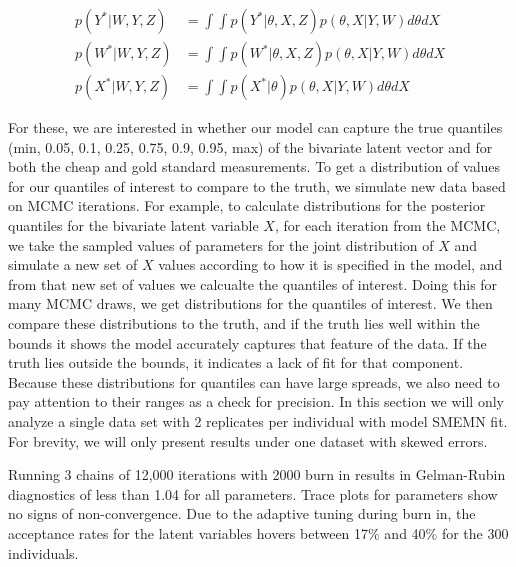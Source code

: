 \documentclass[11pt]{article}\usepackage[]{graphicx}\usepackage[]{color}
\begin{document}
\begin{align}
  \label{ypostpred}
  p(Y^*|W,Y,Z) &= \int \int p(Y^*|\theta,X,Z) p(\theta, X|Y,W) d\theta dX \\
  \label{wpostpred}
  p(W^*|W,Y,Z) &= \int \int p(W^*|\theta,X,Z) p(\theta, X|Y,W) d\theta dX \\
  \label{xpostpred}
  p(X^*|W,Y,Z) &= \int \int p(X^*|\theta) p(\theta, X|Y,W) d\theta dX
\end{align}


For these, we are interested in whether our model can capture the true quantiles (min, 0.05, 0.1, 0.25, 0.75, 0.9, 0.95, max) of the bivariate latent vector and for both the cheap and gold standard measurements. To get a distribution of values for our quantiles of interest to compare to the truth, we simulate new data based on MCMC iterations. For example, to calculate distributions for the posterior quantiles for the bivariate latent variable $X$, for each iteration from the MCMC, we  take the sampled values of parameters for the joint distribution of $X$ and simulate a new set of $X$ values according to how it is specified in the model, and from that new set of values we calcualte the quantiles of interest. Doing this for many MCMC draws, we get distributions for the quantiles of interest. We then compare these distributions to the truth, and if the truth lies well within the bounds it shows the model accurately captures that feature of the data. If the truth lies outside the bounds, it indicates a lack of fit for that component. Because these distributions for quantiles can have large spreads, we also need to pay attention to their ranges as a check for precision. In this section we will only analyze a single data set with 2 replicates per individual with model SMEMN fit. For brevity, we will only present results under one dataset with skewed errors. 

Running 3 chains of 12,000 iterations with 2000 burn in results in Gelman-Rubin diagnostics of less than 1.04 for all parameters. Trace plots for parameters show no signs of non-convergence. Due to the adaptive tuning during burn in, the acceptance rates for the latent variables hovers between 17\% and 40\% for the 300 individuals. %
\end{document}
